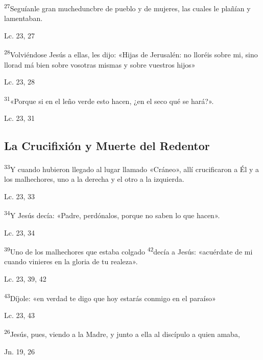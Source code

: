 \documentclass[a4paper,11pt]{article}
\begin{document}
      \textsuperscript{27}Seguíanle gran mucheduncbre de pueblo y de mujeres, las cuales le plañían y lamentaban.
      \begin{flushright}
        Lc. 23, 27
      \end{flushright}

      \textsuperscript{28}Volviéndose Jesús a ellas, les dijo: «Hijas de Jerusalén: no lloréis sobre mi, sino llorad má bien sobre vosotras mismas y sobre
      vuestros hijos»
      \begin{flushright}
        Lc. 23, 28
      \end{flushright}

      \textsuperscript{31}«Porque si en el leño verde esto hacen, ¿en el seco qué se hará?».
      \begin{flushright}
        Lc. 23, 31
      \end{flushright}

    \subsection*{\hfil La Crucifixión y Muerte del Redentor \hfil}
      
      \textsuperscript{33}Y cuando hubieron llegado al lugar llamado «Cráneo», allí crucificaron a Él y a los malhechores, uno a la derecha y el otro a la izquierda.
      \begin{flushright}
        Lc. 23, 33
      \end{flushright}

      \textsuperscript{34}Y Jesús decía: «Padre, perdónalos, porque no saben lo que hacen».
      \begin{flushright}
        Lc. 23, 34
      \end{flushright}

      \textsuperscript{39}Uno de los malhechores que estaba colgado \textsuperscript{42}decía a Jesús: «acuérdate de mi cuando vinieres en la gloria de tu realeza».
      \begin{flushright}
        Lc. 23, 39, 42
      \end{flushright}

      \textsuperscript{43}Díjole: «en verdad te digo que hoy estarás conmigo en el paraíso»
      \begin{flushright}
        Lc. 23, 43
      \end{flushright}

      \textsuperscript{26}Jesús, pues, viendo a la Madre, y junto a ella al discípulo a quien amaba,
      \begin{flushright}
        Jn. 19, 26
      \end{flushright}
\end{document}
